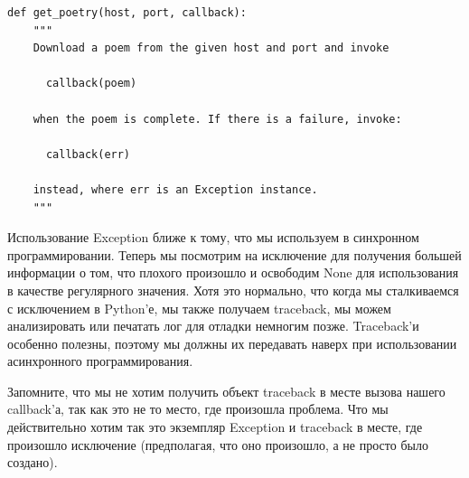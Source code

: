 \begin{scriptsize}\begin{verbatim}
def get_poetry(host, port, callback):
    """
    Download a poem from the given host and port and invoke

      callback(poem)

    when the poem is complete. If there is a failure, invoke:

      callback(err)

    instead, where err is an Exception instance.
    """
\end{verbatim}\end{scriptsize}


Использование Exception ближе к тому, что 
мы используем в синхронном программировании. Теперь 
мы посмотрим на исключение для получения большей информации 
о том, что плохого произошло и освободим None 
для использования в качестве регулярного значения. Хотя это нормально, 
что когда мы сталкиваемся с исключением в Python'е, 
мы также получаем traceback, мы можем анализировать или печатать 
лог для отладки немногим позже. Traceback'и особенно полезны, поэтому 
мы должны их передавать наверх при использовании 
асинхронного программирования.


Запомните, что мы не хотим получить объект traceback в месте 
вызова нашего callback'а, так как это не то место, где произошла 
проблема. Что мы действительно хотим так это экземпляр Exception и 
traceback в месте, где произошло исключение (предполагая, что оно 
произошло, а не просто было создано).



